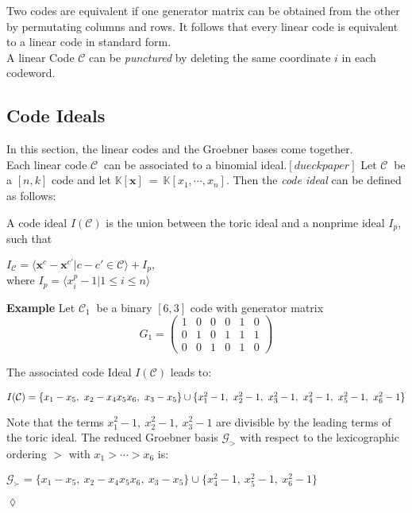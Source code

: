 Two codes are equivalent if one generator matrix can be obtained from the other by permutating columns and rows.
It follows that every linear code is equivalent to a linear code in standard form.\cite{dueckjournal} \\

A linear Code $\mathcal{C}$ can be \textit{punctured} by deleting the same coordinate $i$ in each codeword.


\subsection{Code Ideals}
\label{subsec:codeideals}
In this section, the linear codes and the Groebner bases come together.\\
Each linear code $\mathcal{C}~$ can be associated to a binomial ideal.$[dueckpaper]$ Let $\mathcal{C}~$ be a $[n,k]$ code and let 
$\mathbb{K}[\textbf{x}]~=~\mathbb{K}[x_{1},\cdots,x_{n}]$.
Then the \textit{code ideal} can be defined as follows:

\begin{env_definition}
\cite{dueckpaper} A code ideal $I(\mathcal{C})$ is the union between the toric ideal and a nonprime ideal $I_{p}$, such that
\begin{center}
$ I_{\mathcal{C}} = \langle \textbf{x}^{c} - \textbf{x}^{c'} | c - c' \in \mathcal{C}  \rangle + I_{p},$\\
\textrm{where}
 $I_{p} = \langle x_{i}^{p} - 1 | 1 \leq i \leq n \rangle $
\end{center}
\end{env_definition}


\textbf{Example} Let $\mathcal{C}_{1}~$ be a binary $[6,3]$ code with generator matrix
\[
G_{1} =
\begin{pmatrix}
1 & 0 & 0 & 0 & 1 & 0 \\ 
0 & 1 & 0 & 1 & 1 & 1 \\  
0 & 0 & 1 & 0 & 1 & 0  
\end{pmatrix} 
\]

The associated code Ideal $I(\mathcal{C})$ leads to: \newline
\begin{center}
$I(\mathcal{C}) = \{x_{1}-x_{5},~x_{2}-x_{4}x_{5}x_{6},~x_{3}-x_{5}  \} \cup \newline \{x_{1}^{2}-1,~x_{2}^{2}-1,~x_{3}^{2}-1,~x_{4}^{2}-1,~x_{5}^{2}-1,~x_{6}^{2}-1\}  $
\end{center}
Note that the terms $x_{1}^{2}-1,~x_{2}^{2}-1,~x_{3}^{2}-1 $ are divisible by the leading terms of the toric ideal.
The reduced Groebner basis $\mathcal{G}_{>}$ with respect to the lexicographic ordering $>$ with $x_{1} > \cdots > x_{6}$ is:
\begin{center}
$ \mathcal{G}_{\succ} = \{x_{1}-x_{5},~x_{2}-x_{4}x_{5}x_{6},~x_{3}-x_{5}  \} \cup \{x_{4}^{2}-1,~x_{5}^{2}-1,~x_{6}^{2}-1  \}  $
\end{center}

\begin{flushright}
$\lozenge$
\end{flushright} 

 

\newpage
